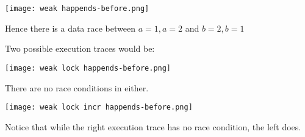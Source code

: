 \documentclass{report}
\begin{document}
        \begin{minipage}{0.5 \textwidth}
        \end{minipage}
        \begin{center}
            \texttt{[image: weak happends-before.png]}
        \end{center}
        Hence there is a data race between $a = 1, a = 2$ and $b = 2, b = 1$
        \\ \begin{minipage}{0.5 \textwidth}
        \end{minipage}
        \begin{minipage}{0.5 \textwidth}
        \end{minipage}
        Two possible execution traces would be:
        \begin{center}
            \texttt{[image: weak lock happends-before.png]}
        \end{center}
        There are no race conditions in either.
        \\ \begin{minipage}{0.5 \textwidth}
        \end{minipage}
        \begin{minipage}{0.5 \textwidth}
        \end{minipage}
        \begin{center}
            \texttt{[image: weak lock incr happends-before.png]}
        \end{center}
        Notice that while the right execution trace has no race condition, the left does.
\end{document}
